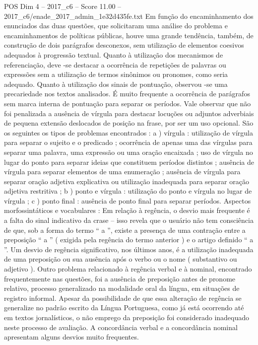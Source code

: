 \begin{textsample}{POS Dim 4 – 2017\_c6 – Score 11.00 – 2017\_c6/enade\_2017\_admin\_1e32d435fe.txt}
Em função do encaminhamento dos enunciados das duas questões, que solicitaram uma análise do problema e encaminhamentos de políticas públicas, houve uma grande tendência, também, de construção de dois parágrafos desconexos, sem utilização de elementos coesivos adequados à progressão textual.
Quanto à utilização dos mecanismos de referenciação, deve -se destacar a ocorrência de repetições de palavras ou expressões sem a utilização de termos sinônimos ou pronomes, como seria adequado.
Quanto à utilização dos sinais de pontuação, observou -se uma precariedade nos textos analisados.
É muito frequente a ocorrência de parágrafos sem marca interna de pontuação para separar os períodos.
Vale observar que não foi penalizada a ausência de vírgula para destacar locuções ou adjuntos adverbiais de pequena extensão deslocados de posição na frase, por ser um uso opcional.
São os seguintes os tipos de problemas encontrados : a ) vírgula : utilização de vírgula para separar o sujeito e o predicado ; ocorrência de apenas uma das vírgulas para separar uma palavra, uma expressão ou uma oração encaixada ; uso de vírgula no lugar do ponto para separar ideias que constituem períodos distintos ; ausência de vírgula para separar elementos de uma enumeração ; ausência de vírgula para separar oração adjetiva explicativa ou utilização inadequada para separar oração adjetiva restritiva ; b ) ponto e vírgula : utilização do ponto e vírgula no lugar de vírgula ; c ) ponto final : ausência de ponto final para separar períodos.
Aspectos morfossintáticos e vocabulares : Em relação à regência, o desvio mais frequente é a falta do sinal indicativo da crase – isso revela que o usuário não tem consciência de que, sob a forma do termo “ a ”, existe a presença de uma contração entre a preposição “ a ” ( exigida pela regência do termo anterior ) e o artigo definido “ a ”.
Um desvio de regência significativo, nos últimos anos, é a utilização inadequada de uma preposição ou sua ausência após o verbo ou o nome ( substantivo ou adjetivo ).
Outro problema relacionado à regência verbal e à nominal, encontrado frequentemente nas questões, foi a ausência de preposição antes de pronome relativo, processo generalizado na modalidade oral da língua, em situações de registro informal.
Apesar da possibilidade de que essa alteração de regência se generalize no padrão escrito da Língua Portuguesa, como já está ocorrendo até em textos jornalísticos, o não emprego da preposição foi considerado inadequado neste processo de avaliação.
A concordância verbal e a concordância nominal apresentam alguns desvios muito frequentes.

\end{textsample}
